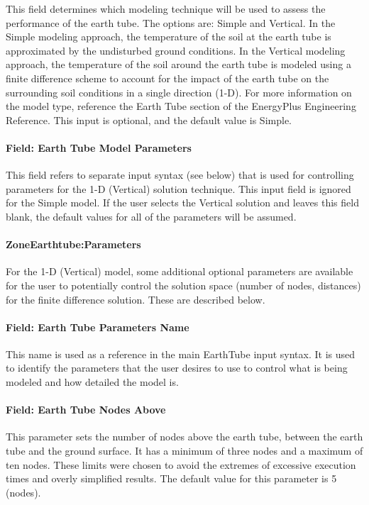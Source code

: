 This field determines which modeling technique will be used to assess the performance of the earth tube.  The options are: Simple and Vertical.  In the Simple modeling approach, the temperature of the soil at the earth tube is approximated by the undisturbed ground conditions.  In the Vertical modeling approach, the temperature of the soil around the earth tube is modeled using a finite difference scheme to account for the impact of the earth tube on the surrounding soil conditions in a single direction (1-D).  For more information on the model type, reference the Earth Tube section of the EnergyPlus Engineering Reference.  This input is optional, and the default value is Simple.

\paragraph{Field: Earth Tube Model Parameters}\label{field-earth-tube-model-parameters}

This field refers to separate input syntax (see below) that is used for controlling parameters for the 1-D (Vertical) solution technique.  This input field is ignored for the Simple model.  If the user selects the Vertical solution and leaves this field blank, the default values for all of the parameters will be assumed.

\paragraph{ZoneEarthtube:Parameters}\label{field-earth-tube-parameters}
For the 1-D (Vertical) model, some additional optional parameters are available for the user to potentially control the solution space (number of nodes, distances) for the finite difference solution.  These are described below.

\paragraph{Field: Earth Tube Parameters Name}\label{field-earth-tube-parameters-name}
This name is used as a reference in the main EarthTube input syntax.  It is used to identify the parameters that the user desires to use to control what is being modeled and how detailed the model is.

\paragraph{Field: Earth Tube Nodes Above}\label{field-earth-tube-nodes-above}
This parameter sets the number of nodes above the earth tube, between the earth tube and the ground surface.  It has a minimum of three nodes and a maximum of ten nodes.  These limits were chosen to avoid the extremes of excessive execution times and overly simplified results.  The default value for this parameter is 5 (nodes).

